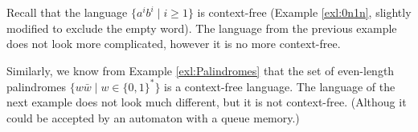 
Recall that the language $\{a^ib^i \mid i \ge 1\}$ is context-free (Example \ref{exl:0n1n}, slightly modified to exclude the empty word).
The language from the previous example does not look more complicated, however it is no more context-free.

Similarly, we know from Example \ref{exl:Palindromes} that the set of even-length palindromes $\{w \bar{w} \mid w \in \{0,1\}^*\}$
is a context-free language.
The language of the next example does not look much different, but it is not context-free.
(Althoug it could be accepted by an automaton with a queue memory.)
